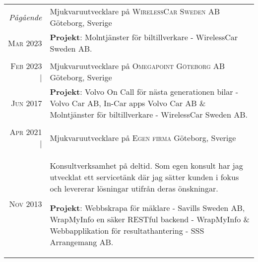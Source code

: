 \documentclass[a4paper,10pt]{scrartcl} %
\begin{document}
\begin{tabular}{r|p{15cm}}


\emph{Pågående} 	                & Mjukvaruutvecklare på \textsc{WirelessCar Sweden AB} \hfill Göteborg, Sverige \\
\phantom{ab} \textsc{Mar 2023} 	    & \footnotesize{
\textbf{Projekt}: Molntjänster för biltillverkare - WirelessCar Sweden AB.} \\
\multicolumn{2}{c}{} \\


\textsc{Feb 2023} |	                & Mjukvaruutvecklare på \textsc{Omegapoint Göteborg AB} \hfill Göteborg, Sverige \\
\phantom{ab} \textsc{Jun 2017} 	    & \footnotesize{
\textbf{Projekt}: Volvo On Call för nästa generationen bilar - Volvo Car AB, In-Car apps Volvo Car AB \& Molntjänster för biltillverkare - WirelessCar Sweden AB.} \\
\multicolumn{2}{c}{} \\


\textsc{Apr 2021} |	                & Mjukvaruutvecklare på \textsc{Egen firma} \hfill Göteborg, Sverige \\
\phantom{ab} \textsc{Nov 2013} 	    & \footnotesize{Konsultverksamhet på deltid. Som egen konsult har jag utvecklat ett servicetänk där jag sätter kunden i fokus och levererar lösningar utifrån deras önskningar.

\textbf{Projekt}: Webbskrapa för mäklare - Savills Sweden AB, WrapMyInfo en säker RESTful backend - WrapMyInfo \& Webbapplikation för resultathantering - SSS Arrangemang AB.} \\


\end{tabular}

\end{document}
